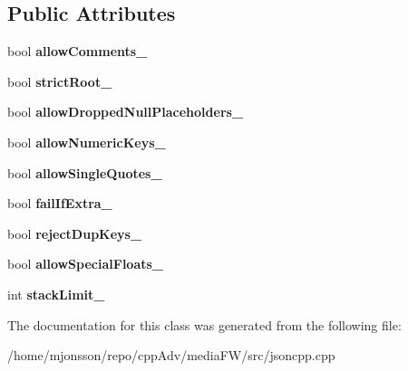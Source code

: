 \subsection*{Public Attributes}
\begin{DoxyCompactItemize}
\item 
\mbox{\label{classJson_1_1OurFeatures_ac71bb7ba7363d3b05ed76602b036ce33}} 
bool {\bfseries allow\+Comments\+\_\+}
\item 
\mbox{\label{classJson_1_1OurFeatures_a2095f66a776c0a4ae6cc931a0c94242e}} 
bool {\bfseries strict\+Root\+\_\+}
\item 
\mbox{\label{classJson_1_1OurFeatures_a13963bc44bf948eec1968f7ff8e8f5f1}} 
bool {\bfseries allow\+Dropped\+Null\+Placeholders\+\_\+}
\item 
\mbox{\label{classJson_1_1OurFeatures_af6973fc7e774ce2d634ba99442aeb91a}} 
bool {\bfseries allow\+Numeric\+Keys\+\_\+}
\item 
\mbox{\label{classJson_1_1OurFeatures_abbd6c196d7a22e2a360a59887eda4610}} 
bool {\bfseries allow\+Single\+Quotes\+\_\+}
\item 
\mbox{\label{classJson_1_1OurFeatures_ae8ad25b90706c78f1a8fe929191ac61b}} 
bool {\bfseries fail\+If\+Extra\+\_\+}
\item 
\mbox{\label{classJson_1_1OurFeatures_a39b8e0b86b1c24a45e800c023bb715aa}} 
bool {\bfseries reject\+Dup\+Keys\+\_\+}
\item 
\mbox{\label{classJson_1_1OurFeatures_af760f91cc2a7af37e44f78fb466061bb}} 
bool {\bfseries allow\+Special\+Floats\+\_\+}
\item 
\mbox{\label{classJson_1_1OurFeatures_a9a786713902d14be6d57a08cc03ccfff}} 
int {\bfseries stack\+Limit\+\_\+}
\end{DoxyCompactItemize}


The documentation for this class was generated from the following file\+:\begin{DoxyCompactItemize}
\item 
/home/mjonsson/repo/cpp\+Adv/media\+F\+W/src/jsoncpp.\+cpp\end{DoxyCompactItemize}
